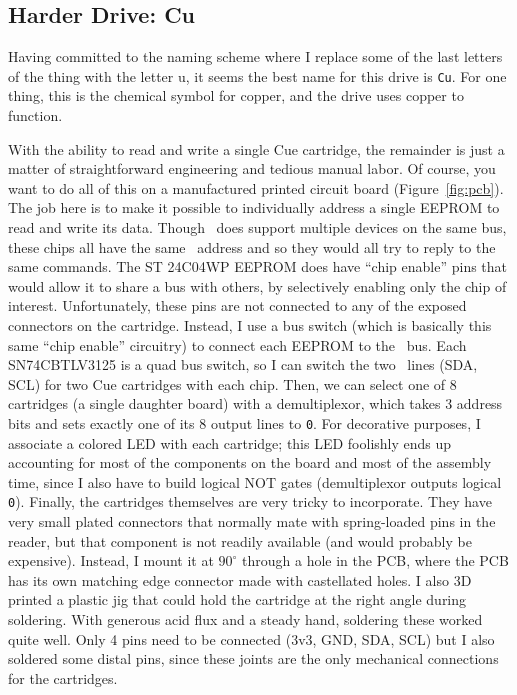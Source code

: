 \documentclass[twocolumn]{article}
\begin{document}
\subsection{Harder Drive: Cu}

Having committed to the naming scheme where I replace some of the last
letters of the thing with the letter u, it seems the best name for
this drive is {\tt Cu}. For one thing, this is the chemical symbol for
copper, and the drive uses copper to function.

With the ability to read and write a single Cue cartridge, the
remainder is just a matter of straightforward engineering and tedious
manual labor. Of course, you want to do all of this on a manufactured
printed circuit board (Figure~\ref{fig:pcb}). The job here is to make
it possible to individually address a single EEPROM to read and write
its data. Though \itwoc\ does support multiple devices on the same
bus, these chips all have the same \itwoc\ address and so they would
all try to reply to the same commands. The ST 24C04WP EEPROM does have
``chip enable'' pins that would allow it to share a bus with others,
by selectively enabling only the chip of interest. Unfortunately,
these pins are not connected to any of the exposed connectors on the
cartridge. Instead, I use a bus switch (which is basically this same
``chip enable'' circuitry) to connect each EEPROM to the \itwoc\ bus.
Each SN74CBTLV3125 is a quad bus switch, so I can switch the two
\itwoc\ lines (SDA, SCL) for two Cue cartridges with each chip. Then,
we can select one of 8 cartridges (a single daughter board) with a
demultiplexor, which takes 3 address bits and sets exactly one of its
8 output lines to {\tt 0}. For decorative purposes, I associate a
colored LED with each cartridge; this LED foolishly ends up accounting
for most of the components on the board and most of the assembly time,
since I also have to build logical NOT gates (demultiplexor outputs
logical {\tt 0}). Finally, the cartridges themselves are very tricky
to incorporate. They have very small plated connectors that normally
mate with spring-loaded pins in the reader, but that component is not
readily available (and would probably be expensive). Instead, I mount
it at $90^\circ$ through a hole in the PCB, where the PCB has its own
matching edge connector made with castellated holes. I also 3D printed
a plastic jig that could hold the cartridge at the right angle during
soldering. With generous acid flux and a steady hand, soldering these
worked quite well. Only 4 pins need to be connected (3v3, GND, SDA,
SCL) but I also soldered some distal pins, since these joints are the
only mechanical connections for the cartridges.
\end{document}
